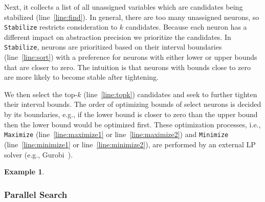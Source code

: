 \documentclass[oneside,11pt,dvipsnames]{book}
\numberwithin{equation}{section}
\theoremstyle{definition}
\newtheorem{example}{Example}[section]
\theoremstyle{remark}
\newcommand{\functiontextformat}[1]{\textrm{\texttt{#1}}}
\newcommand{\tvn}[1]{\iftoggle{usecomment}{{\color{red}{[TVN]: #1}}}{}}
\newcommand{\tool}{\texttt{NeuralSAT}}
\begin{document}
Next, it collects a list of all unassigned variables which are candidates being stabilized (line~\ref{line:find}).
In general, there are too many unassigned neurons, so
\functiontextformat{Stabilize} restricts consideration to $k$ candidates.
Because each neuron has a different impact on abstraction precision we prioritize the candidates.
In \functiontextformat{Stabilize}, neurons are prioritized based on their interval boundaries (line~\ref{line:sort}) with a preference for neurons with either lower or upper bounds that are closer to zero.
The intuition is that neurons with bounds close to zero are more likely to become stable after tightening.

We then select the top-$k$ (line~\ref{line:topk}) candidates and seek to further tighten their interval bounds.
The order of optimizing bounds of select neurons is decided by its boundaries, e.g., if the lower bound is closer to zero than the upper bound then the lower bound would be optimized first.
These optimization processes, i.e., \functiontextformat{Maximize} (line~\ref{line:maximize1} or line~\ref{line:maximize2}) and \functiontextformat{Minimize} (line~\ref{line:minimize1} or line~\ref{line:minimize2}), are performed by an external LP solver (e.g., Gurobi~\cite{gurobi}).




\begin{example}
  \tvn{Need a concrete example here.  Use the DNN in Fig.~\ref{fig:dnn} and create the MILP system in ~\autoref{eq:mip}.}
\end{example}

\subsubsection{Parallel Search}\label{sec:parallel-search}
\end{document}
